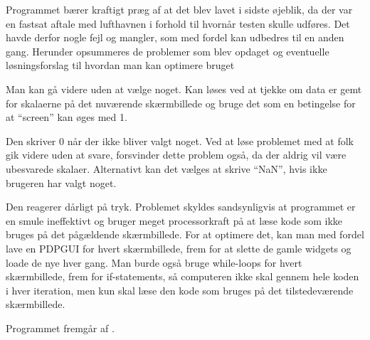 Programmet bærer kraftigt præg af at det blev lavet i sidste øjeblik, da der var en fastsat aftale med lufthavnen i forhold til hvornår testen skulle udføres. Det havde derfor nogle fejl og mangler, som med fordel kan udbedres til en anden gang. Herunder opsummeres de problemer som blev opdaget og eventuelle løsningsforslag til hvordan man kan optimere bruget 

Man kan gå videre uden at vælge noget. Kan løses ved at tjekke om data er gemt for skalaerne på det nuværende skærmbillede og bruge det som en betingelse for at ``screen'' kan øges med 1.

Den skriver 0 når der ikke bliver valgt noget. Ved at løse problemet med at folk gik videre uden at svare, forsvinder dette problem også, da der aldrig vil være ubesvarede skalaer. Alternativt kan det vælges at skrive ``NaN'', hvis ikke brugeren har valgt noget.

Den reagerer dårligt på tryk. Problemet skyldes sandsynligvis at programmet er en smule ineffektivt og bruger meget processorkraft på at læse kode som ikke bruges på det pågældende skærmbillede. For at optimere det, kan man med fordel lave en PDPGUI for hvert skærmbillede, frem for at slette de gamle widgets og loade de nye hver gang. Man burde også bruge while-loops for hvert skærmbillede, frem for if-statements, så computeren ikke skal gennem hele koden i hver iteration, men kun skal læse den kode som bruges på det tilstedeværende skærmbillede.

Programmet fremgår af .
